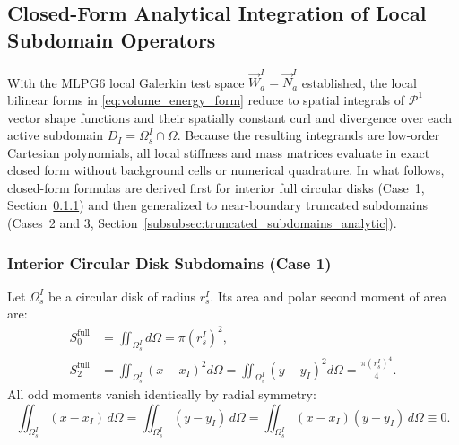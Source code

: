 \documentclass[VANCOUVER,Times1COL]{WileyNJD-v5}
\begin{document}
\subsection{Closed-Form Analytical Integration of Local Subdomain Operators}
\label{subsec:analytic_formulas}

With the MLPG6 local Galerkin test space $\vec{W}_a^I = \vec{N}_a^I$ established, the local bilinear forms in \eqref{eq:volume_energy_form} reduce to spatial integrals of $\mathcal{P}^1$ vector shape functions and their spatially constant curl and divergence over each active subdomain $D_I = \Omega_s^I \cap \Omega$. Because the resulting integrands are low-order Cartesian polynomials, all local stiffness and mass matrices evaluate in exact closed form without background cells or numerical quadrature. In what follows, closed-form formulas are derived first for interior full circular disks (Case~1, Section~\ref{subsubsec:interior_disk_analytic}) and then generalized to near-boundary truncated subdomains (Cases~2 and 3, Section~\ref{subsubsec:truncated_subdomains_analytic}).

\subsubsection{Interior Circular Disk Subdomains (Case 1)}
\label{subsubsec:interior_disk_analytic}

Let $\Omega_s^I$ be a circular disk of radius $r_s^I$. Its area and polar second moment of area are:
\begin{equation}
    \begin{aligned}
        S_0^{\mathrm{full}} & = \iint_{\Omega_s^I} d\Omega = \pi (r_s^I)^2,                                                                \\
        S_2^{\mathrm{full}} & = \iint_{\Omega_s^I} (x - x_I)^2 d\Omega = \iint_{\Omega_s^I} (y - y_I)^2 d\Omega = \frac{\pi (r_s^I)^4}{4}.
    \end{aligned}
    \label{eq:disk_moments}
\end{equation}
All odd moments vanish identically by radial symmetry:
\begin{equation}
    \iint_{\Omega_s^I} (x - x_I) \, d\Omega = \iint_{\Omega_s^I} (y - y_I) \, d\Omega = \iint_{\Omega_s^I} (x - x_I)(y - y_I) \, d\Omega \equiv 0.
\end{equation}
\end{document}
